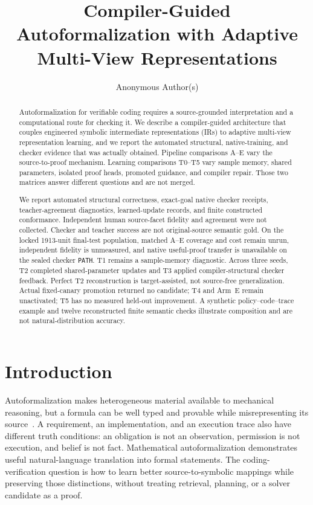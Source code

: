 \documentclass{article}
\title{Compiler-Guided Autoformalization with Adaptive\\Multi-View Representations}
\author{Anonymous Author(s)}
\begin{document}
\maketitle

\begin{abstract}
Autoformalization for verifiable coding requires a source-grounded interpretation and a computational route for checking it. We describe a compiler-guided architecture that couples engineered symbolic intermediate representations (IRs) to adaptive multi-view representation learning, and we report the automated structural, native-training, and checker evidence that was actually obtained. Pipeline comparisons A--E vary the source-to-proof mechanism. Learning comparisons T0--T5 vary sample memory, shared parameters, isolated proof heads, promoted guidance, and compiler repair. Those two matrices answer different questions and are not merged.

We report automated structural correctness, exact-goal native checker receipts, teacher-agreement diagnostics, learned-update records, and finite constructed conformance. Independent human source-facet fidelity and agreement were not collected. Checker and teacher success are not original-source semantic gold. On the locked 1913-unit final-test population, matched A--E coverage and cost remain unrun, independent fidelity is unmeasured, and native useful-proof transfer is unavailable on the sealed checker \texttt{PATH}. T1 remains a sample-memory diagnostic. Across three seeds, T2 completed shared-parameter updates and T3 applied compiler-structural checker feedback. Perfect T2 reconstruction is target-assisted, not source-free generalization. Actual fixed-canary promotion returned no candidate; T4 and Arm~E remain unactivated; T5 has no measured held-out improvement. A synthetic policy--code--trace example and twelve reconstructed finite semantic checks illustrate composition and are not natural-distribution accuracy.
\end{abstract}

\section{Introduction}
Autoformalization makes heterogeneous material available to mechanical reasoning, but a formula can be well typed and provable while misrepresenting its source~\citep{wu2022autoformalization,azerbayev2023proofnet,jiang2024multilanguage}. A requirement, an implementation, and an execution trace also have different truth conditions: an obligation is not an observation, permission is not execution, and belief is not fact. Mathematical autoformalization demonstrates useful natural-language translation into formal statements. The coding-verification question is how to learn better source-to-symbolic mappings while preserving those distinctions, without treating retrieval, planning, or a solver candidate as a proof.
\end{document}
